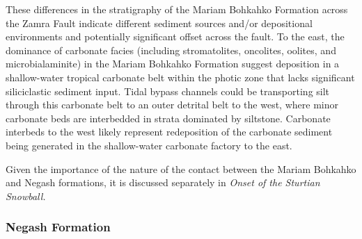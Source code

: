 These differences in the stratigraphy of the Mariam Bohkahko Formation across the Zamra Fault indicate different sediment sources and/or depositional environments and potentially significant offset across the fault. To the east, the dominance of carbonate facies (including stromatolites, oncolites, oolites, and microbialaminite) in the Mariam Bohkahko Formation suggest deposition in a shallow-water tropical carbonate belt within the photic zone that lacks significant siliciclastic sediment input. Tidal bypass channels could be transporting silt through this carbonate belt to an outer detrital belt to the west, where minor carbonate beds are interbedded in strata dominated by siltstone. Carbonate interbeds to the west likely represent redeposition of the carbonate sediment being generated in the shallow-water carbonate factory to the east.

Given the importance of the nature of the contact between the Mariam Bohkahko and Negash formations, it is discussed separately in \textit{Onset of the Sturtian Snowball.}

\subsubsection{Negash Formation}

